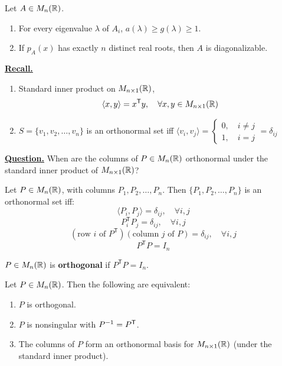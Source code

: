 \begin{remark}
Let $A \in M_n(\mathbb{R})$.
\begin{enumerate}
    \item For every eigenvalue $\lambda$ of $A_i$, $a(\lambda) \geq g(\lambda) \geq 1$.
    \item If $p_A(x)$ has exactly $n$ distinct real roots, then $A$ is diagonalizable.
\end{enumerate}
\end{remark}

\lline

\ul{\textbf{Recall.}}
\begin{enumerate}
    \item Standard inner product on $M_{n \times 1}(\mathbb{R})$,
    $$\langle x, y \rangle = x^{\mathsf{T}} y, \quad \forall x, y \in M_{n \times 1}(\mathbb{R})$$
    \item $S = \{v_1, v_2, \dots, v_n\}$ is an orthonormal set iff $\langle v_i, v_j \rangle = \begin{cases}
        0, \quad i \neq j \\
        1, \quad i = j
    \end{cases} = \delta_{ij}$
\end{enumerate}

\ul{\textbf{Question.}} When are the columns of $P \in M_n(\mathbb{R})$ orthonormal under the standard inner product of $M_{n \times 1}(\mathbb{R})$?

Let $P \in M_n(\mathbb{R})$, with columns $P_1, P_2, \dots, P_n$. Then $\{P_1, P_2, \dots, P_n\}$ is an orthonormal set iff:
$$\langle P_i, P_j \rangle = \delta_{ij}, \quad \forall i, j$$
$$P_i^{\mathsf{T}} P_j = \delta_{ij}, \quad \forall i, j$$
$$(\text{row } i \text{ of } P^{\mathsf{T}})(\text{column } j \text{ of } P) = \delta_{ij},\quad \forall i, j$$
$$P^{\mathsf{T}} P = I_n$$

\begin{definition}
$P \in M_n(\mathbb{R})$ is \textbf{orthogonal} if $P^{\mathsf{T}} P = I_n$.
\end{definition}

\begin{theorem}
Let $P \in M_n(\mathbb{R})$. Then the following are equivalent:
\begin{enumerate}
    \item $P$ is orthogonal.
    \item $P$ is nonsingular with $P^{-1} = P^{\mathsf{T}}$.
    \item The columns of $P$ form an orthonormal basis for $M_{n \times 1}(\mathbb{R})$ (under the standard inner product).
\end{enumerate}
\end{theorem}

